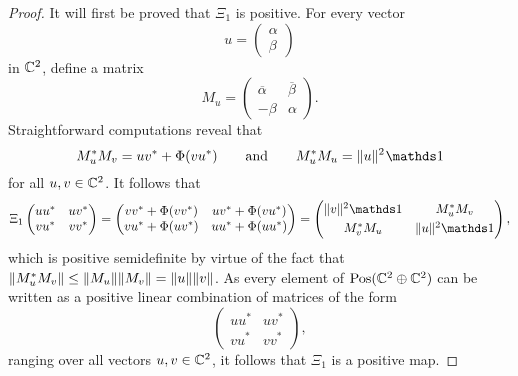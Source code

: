 \begin{proof}
  It will first be proved that $\Xi_1$ is positive.
  For every vector
  \begin{equation}
    u = \begin{pmatrix}
      \alpha\\ \beta
    \end{pmatrix}
  \end{equation}
  in $\mathbb{C}^2$, define a matrix
  \begin{equation}
    M_u = \begin{pmatrix}
      \overline\alpha & \overline\beta\\[1mm]
      -\beta & \alpha
    \end{pmatrix}.
  \end{equation}
  Straightforward computations reveal that
  \begin{equation}
    M_u^{\ast} M_v = u v^{\ast} + \Phi(v u^{\ast})
    \qquad\text{and}\qquad
    M_u^{\ast} M_u = \norm{u}^2\tinyspace \I
  \end{equation}
  for all $u,v\in\mathbb{C}^2$.
  It follows that
  \begin{equation}
    \Xi_1 \begin{pmatrix}
      u u^{\ast} & u v^{\ast}\\
      v u^{\ast} & v v^{\ast}
    \end{pmatrix}
    = \begin{pmatrix}
      v v^{\ast} + \Phi(v v^{\ast}) & 
      u v^{\ast} + \Phi(v u^{\ast}) \\
      v u^{\ast} + \Phi(u v^{\ast}) &
      u u^{\ast} + \Phi(u u^{\ast}) 
    \end{pmatrix}
    = \begin{pmatrix}
      \norm{v}^2 \I & M_u^{\ast} M_v\\[1mm]
      M_v^{\ast} M_u & \norm{u}^2 \I
    \end{pmatrix},
  \end{equation}
  which is positive semidefinite by virtue of the fact that
  $\lVert M_u^{\ast} M_v\rVert\leq\lVert M_u\rVert\lVert M_v\rVert = \lVert u\rVert \lVert v\rVert$.
  As every element of $\mathrm{Pos}(\mathbb{C}^2\oplus\mathbb{C}^2)$ can be written as a
  positive linear combination of matrices of the form
  \begin{equation}
    \begin{pmatrix}
      u u^{\ast} & u v^{\ast}\\
      v u^{\ast} & v v^{\ast}
    \end{pmatrix},
  \end{equation}
  ranging over all vectors $u, v \in \mathbb{C}^2$, it follows that $\Xi_1$ is a
  positive map.


\end{proof}
